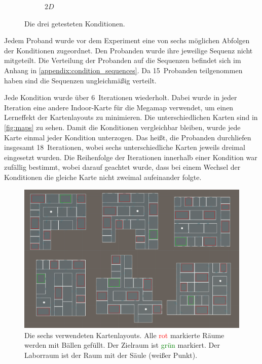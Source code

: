\begin{figure}[h]
\begin{subfigure}{0.33\linewidth}
        \caption{$2D$}
    \end{subfigure}%
    \caption{Die drei getesteten Konditionen.}
    \label{fig:conditions}
\end{figure}
Jedem Proband wurde vor dem Experiment eine von sechs möglichen Abfolgen der Konditionen zugeordnet.
Den Probanden wurde ihre jeweilige Sequenz nicht mitgeteilt.
Die Verteilung der Probanden auf die Sequenzen befindet sich im Anhang in \autoref{appendix:condition_sequences}.
Da 15~Probanden teilgenommen haben sind die Sequenzen ungleichmäßig verteilt.

Jede Kondition wurde über 6~Iterationen wiederholt.
Dabei wurde in jeder Iteration eine andere Indoor-Karte für die Megamap verwendet, um einen Lerneffekt der Kartenlayouts zu minimieren.
Die unterschiedlichen Karten sind in \autoref{fig:maps} zu sehen.
Damit die Konditionen vergleichbar bleiben, wurde jede Karte einmal jeder Kondition unterzogen.
Das heißt, die Probanden durchliefen insgesamt 18~Iterationen, wobei sechs unterschiedliche Karten jeweils dreimal eingesetzt wurden.
Die Reihenfolge der Iterationen innerhalb einer Kondition war zufällig bestimmt, wobei darauf geachtet wurde, dass bei einem Wechsel der Konditionen die gleiche Karte nicht zweimal aufeinander folgte.
\begin{figure}[h]
    \centering
    \includegraphics[width=\linewidth]{figures/screenshots/maps_all}
    \caption{Die sechs verwendeten Kartenlayouts. %
    Alle \textcolor{red}{rot} markierte Räume werden mit Bällen gefüllt. %
    Der Zielraum ist \textcolor{green}{grün} markiert. %
    Der Laborraum ist der Raum mit der Säule (weißer Punkt).}
    \label{fig:maps}
\end{figure}

